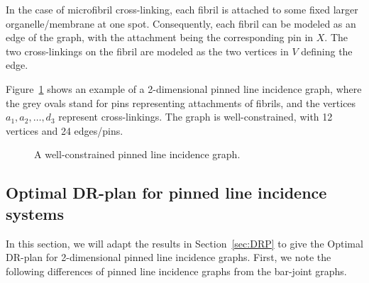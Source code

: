 In the case of microfibril cross-linking, each fibril is
attached to some fixed larger organelle/membrane at one spot.
Consequently, each fibril can be modeled as an edge of the graph,
with the attachment being the corresponding pin in $X$.
The two cross-linkings on the fibril are modeled as the two vertices in $V$ defining the edge.


Figure~\ref{fig:pinned_line} shows an example of a 2-dimensional pinned line incidence graph,
where the grey ovals stand for pins representing attachments of fibrils,
and the vertices $a_1,a_2,\ldots, d_3$ represent cross-linkings.
The graph is well-constrained, with 12 vertices and 24 edges/pins.

\begin{figure}
  \centering
\caption{ A well-constrained pinned line incidence graph.}
\label{fig:pinned_line}
\end{figure}


\subsection{Optimal DR-plan for pinned line incidence systems}


In this section, we will adapt the results in Section~\ref{sec:DRP}
to give the Optimal DR-plan for 2-dimensional pinned line incidence graphs.
First, we note the following differences of pinned line incidence graphs from the bar-joint graphs.

